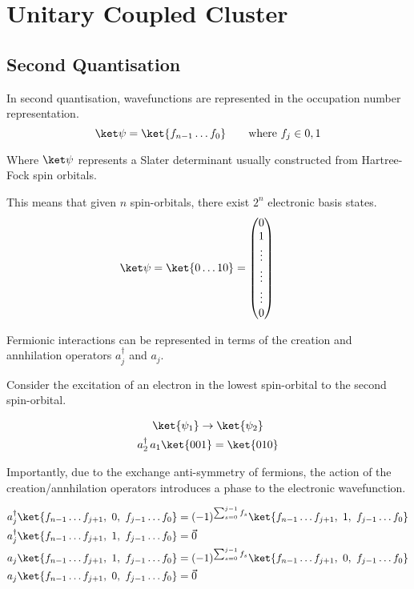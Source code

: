 \section{Unitary Coupled Cluster}
\subsection{Second Quantisation}
In second quantisation, wavefunctions are represented in the occupation number representation.
\begin{equation*}
    \ket\psi = \ket{f_{n-1} \dots f_{0}} \qquad \text{where } f_{j} \in {0, 1}
\end{equation*}

Where $\ket\psi$ represents a Slater determinant usually constructed from Hartree-Fock spin orbitals.

This means that given $n$ spin-orbitals, there exist $2^n$ electronic basis states.
\begin{equation*}
    \ket\psi = \ket{0 \dots 10} =
    \begin{pmatrix} 0 \\ 1 \\ \vdots \\ \vdots \\ \vdots \\ 0 \end{pmatrix} \qquad
\end{equation*}

Fermionic interactions can be represented in terms of the creation and annhilation operators $a_j^\dagger$ and $a_j$. \bigskip

Consider the excitation of an electron in the lowest spin-orbital to the second spin-orbital.

\begin{equation*}
\begin{gathered}
    \ket{\psi_1} \rightarrow \ket{\psi_2} \\
    a_2^\dagger \, a_1 \ket{001} = \ket{010}
\end{gathered}
\end{equation*}

Importantly, due to the exchange anti-symmetry of fermions, the action of the creation/annhilation operators introduces a phase to the electronic wavefunction.

\begin{align*}
    a_j^\dagger \ket{f_{n-1} \dots
    f_{j+1},\,\, 0,\,\, f_{j-1} \dots f_0} &=
    (-1)^{\sum_{s=0}^{j-1} f_s}
    \ket{f_{n-1} \dots f_{j+1},\,\, 1,\,\, f_{j-1} \dots f_0} \\
    a_j^\dagger \ket{f_{n-1} \dots f_{j+1},\,\, 1,\,\, f_{j-1}
    \dots f_0} &= \vec 0 \\
    a_j \ket{f_{n-1} \dots f_{j+1},\,\, 1,\,\, f_{j-1} \dots f_0} &=
    (-1)^{\sum_{s=0}^{j-1} f_s}
    \ket{f_{n-1} \dots f_{j+1},\,\, 0,\,\, f_{j-1} \dots f_0} \\
    a_j \ket{f_{n-1} \dots f_{j+1},\,\, 0,\,\, f_{j-1} \dots f_0} &= \vec 0
\end{align*}

